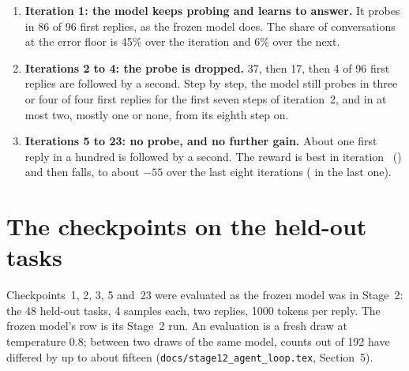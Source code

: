\documentclass[11pt,a4paper]{article}
\begin{document}
\begin{enumerate}[leftmargin=*, itemsep=0.3em]
\item \textbf{Iteration 1: the model keeps probing and learns to answer.}
  It probes in 86 of 96 first replies, as the frozen model does. The share
  of conversations at the error floor is 45\% over the iteration and 6\%
  over the next.
\item \textbf{Iterations 2 to 4: the probe is dropped.} 37, then 17, then 4
  of 96 first replies are followed by a second. Step by step, the model
  still probes in three or four of four first replies for the first seven
  steps of iteration~2, and in at most two, mostly one or none, from its
  eighth step on.
\item \textbf{Iterations 5 to 23: no probe, and no further gain.} About one
  first reply in a hundred is followed by a second. The reward is best in
  iteration~\TRbestiteration{} (\TRbestreward) and then falls, to about $-55$
  over the last eight iterations (\TRlastreward{} in the last one).
\end{enumerate}

\section{The checkpoints on the held-out tasks}

Checkpoints~1, 2, 3, 5 and~23 were evaluated as the frozen model was in
Stage~2:
the 48 held-out tasks, 4 samples each, two replies, 1000 tokens per reply.
The frozen model's row is its Stage~2 run. An evaluation is a fresh draw at
temperature 0.8; between two draws of the same model, counts out of 192 have
differed by up to about fifteen (\texttt{docs/stage12\_agent\_loop.tex},
Section~5).

\begin{table}[h]
\centering\small
\resizebox{\linewidth}{!}{}
\caption{The frozen model and five checkpoints. Valid: the task
ended with a final run whose controller passed validation. Probe rate: the
first reply was a probe run whose output came back.}
\label{tab:comparison}
\end{table}

\begin{table}[h]
\centering\small

\caption{The samples by what their replies were, in order.}
\label{tab:sequences}
\end{table}
\end{document}
